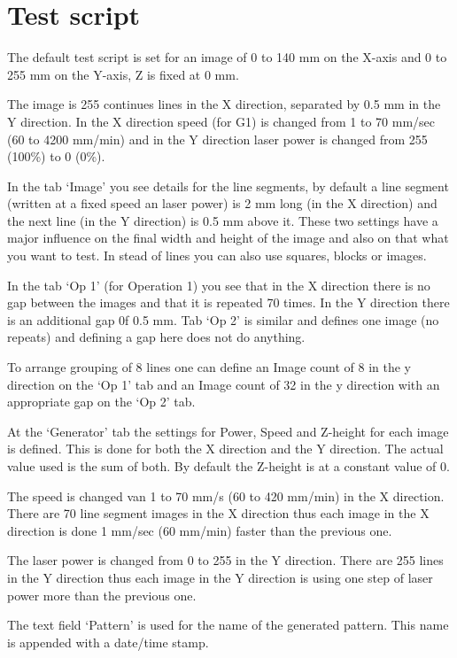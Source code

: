 \WarningCheckAndTest

\section{Test script}
The default test script is set for an image of 0 to 140 mm on the X-axis and 0 to 255 mm on the Y-axis, Z is fixed at 0 mm.

The image is 255 continues lines in the X direction, separated by 0.5 mm in the Y direction.
In the X direction speed (for G1) is changed from 1 to 70 mm/sec (60 to 4200 mm/min) and in the Y direction laser power is changed from 255 (100\%) to 0 (0\%).

In the tab `Image' you see details for the line segments, by default a line segment (written at a fixed speed an laser power) is 2 mm long (in the X direction) and the next line (in the Y direction)
is 0.5 mm above it. These two settings have a major influence on the final width and height of the image and also on that what you want to test. In stead of lines you can also use squares, blocks or images.

In the tab `Op 1' (for Operation 1) you see that in the X direction there is no gap between the images and that it is repeated 70 times. In the Y direction there is an additional gap 0f 0.5 mm.
Tab `Op 2' is similar and defines one image (no repeats) and defining a gap here does not do anything.

To arrange grouping of 8 lines one can define an Image count of 8 in the y direction on the `Op 1' tab and an Image count of 32 in the y direction with an appropriate gap on the `Op 2' tab.

At the `Generator' tab the settings for Power, Speed and Z-height for each image is defined. This is done for both the X direction and the Y direction. The actual value used is the sum of both.
By default the Z-height is at a constant value of 0.

The speed is changed van 1 to 70 mm/s (60 to 420 mm/min) in the X direction. There are 70 line segment images in the X direction thus each
image in the X direction is done 1 mm/sec (60 mm/min) faster than the previous one.

The laser power is changed from 0 to 255 in the Y direction. There are 255 lines in the Y direction thus each image in the Y direction is using one step of laser power more than the previous one.

The text field `Pattern' is used for the name of the generated pattern. This name is appended with a date/time stamp.

